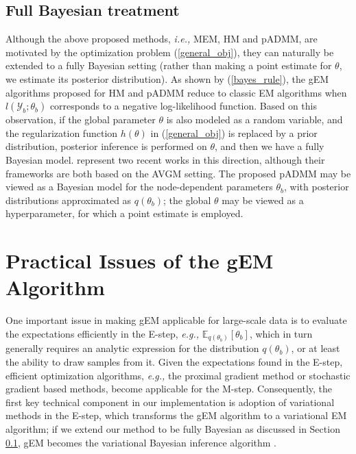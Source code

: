 \documentclass{article}
\newcommand{\ie}[0]{\emph{i.e., }}
\newcommand{\eg}[0]{\emph{e.g., }}
\newcommand{\1}[0]{\ensuremath{\boldsymbol{1}}\xspace}
\begin{document}
\subsection{Full Bayesian treatment}\label{Full_Bayesian}
Although the above proposed methods, \ie MEM, HM and pADMM, are motivated by the optimization problem (\ref{general_obj}), they can naturally be extended to a fully Bayesian setting (rather than making a point estimate for $\theta$, we estimate its posterior distribution). As shown by (\ref{bayes_rule}), the gEM algorithms proposed for HM and pADMM reduce to classic EM algorithms when $l(\mathcal{Y}_b; \theta_b)$ corresponds to a negative log-likelihood function. Based on this observation, if the global parameter $\theta$ is also modeled as a random variable, and the regularization function $h(\theta)$ in (\ref{general_obj}) is replaced by a prior distribution, posterior inference is performed on $\theta$, and then we have a fully Bayesian model. \cite{Scott2013, Neiswanger2013} represent two recent works in this direction, although their frameworks are both based on the AVGM setting. The proposed pADMM may be viewed as a Bayesian model for the node-dependent parameters $\theta_b$, with posterior distributions approximated as $q(\theta_b)$; the global $\theta$ may be viewed as a hyperparameter, for which a point estimate is employed.


\section{Practical Issues of the gEM Algorithm}\label{variational_EM}
One important issue in making gEM applicable for large-scale data is to evaluate the expectations efficiently in the E-step, \eg $\mathbb{E}_{q(\theta_b)}[\theta_b]$, which in turn generally requires an analytic expression for the distribution $q(\theta_b)$, or at least the ability to draw samples from it. Given the expectations found in the E-step, efficient optimization algorithms, \eg the proximal gradient method or stochastic gradient based methods, become applicable for the M-step. Consequently, the first key technical component in our implementation is adoption of variational methods \cite{Wainwright2008} in the E-step, which transforms the gEM algorithm to a variational EM algorithm; if we extend our method to be fully Bayesian as discussed in Section \ref{Full_Bayesian}, gEM becomes the variational Bayesian inference algorithm \cite{Bishop2006}.
\end{document}
